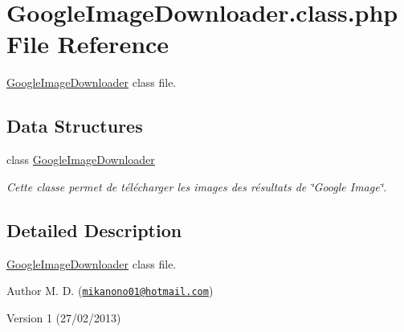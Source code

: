 \hypertarget{_google_image_downloader_8class_8php}{\section{Google\-Image\-Downloader.\-class.\-php File Reference}
\label{_google_image_downloader_8class_8php}
}


\hyperlink{class_google_image_downloader}{Google\-Image\-Downloader} class file.  


\subsection*{Data Structures}
\begin{DoxyCompactItemize}
\item 
class \hyperlink{class_google_image_downloader}{Google\-Image\-Downloader}
\begin{DoxyCompactList}\small\item\em Cette classe permet de télécharger les images des résultats de \char`\"{}\-Google Image\char`\"{}. \end{DoxyCompactList}\end{DoxyCompactItemize}


\subsection{Detailed Description}
\hyperlink{class_google_image_downloader}{Google\-Image\-Downloader} class file. \begin{DoxyAuthor}{Author}
M. D. (\href{mailto:mikanono01@hotmail.com}{\tt mikanono01@hotmail.\-com}) 
\end{DoxyAuthor}
\begin{DoxyVersion}{Version}
1 (27/02/2013) 
\end{DoxyVersion}
